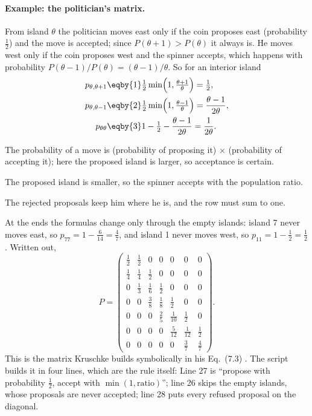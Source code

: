 \paragraph{Example: the politician's matrix.}
From island $\theta$ the politician moves east only if the coin proposes east (probability
$\tfrac12$) and the move is accepted; since $P(\theta+1)>P(\theta)$ it always is. He moves west
only if the coin proposes west and the spinner accepts, which happens with probability
$P(\theta-1)/P(\theta)=(\theta-1)/\theta$. So for an interior island
\begin{align}
  p_{\theta,\theta+1}
  &\eqby{1}\tfrac12\min\Bigl(1,\tfrac{\theta+1}{\theta}\Bigr)=\tfrac12, \nonumber\\
  p_{\theta,\theta-1}
  &\eqby{2}\tfrac12\min\Bigl(1,\tfrac{\theta-1}{\theta}\Bigr)=\frac{\theta-1}{2\theta}, \nonumber\\
  p_{\theta\theta}
  &\eqby{3}1-\tfrac12-\frac{\theta-1}{2\theta}=\frac{1}{2\theta}.
  \label{9a:eq:politician-rows}
\end{align}
\begin{explain}
  \item The probability of a move is (probability of proposing it) $\times$ (probability of
        accepting it); here the proposed island is larger, so acceptance is certain.
  \item The proposed island is smaller, so the spinner accepts with the population ratio.
  \item The rejected proposals keep him where he is, and the row must sum to one.
\end{explain}
At the ends the formulas change only through the empty islands: island 7 never moves east, so
$p_{77}=1-\tfrac{6}{14}=\tfrac47$, and island 1 never moves west, so
$p_{11}=1-\tfrac12=\tfrac12$. Written out,
\begin{equation}
  P=\begin{pmatrix}
   \frac12&\frac12&0&0&0&0&0\\[2pt]
   \frac14&\frac14&\frac12&0&0&0&0\\[2pt]
   0&\frac13&\frac16&\frac12&0&0&0\\[2pt]
   0&0&\frac38&\frac18&\frac12&0&0\\[2pt]
   0&0&0&\frac25&\frac1{10}&\frac12&0\\[2pt]
   0&0&0&0&\frac5{12}&\frac1{12}&\frac12\\[2pt]
   0&0&0&0&0&\frac37&\frac47
  \end{pmatrix}.
  \label{9a:eq:politician-matrix}
\end{equation}
This is the matrix Kruschke builds symbolically in his Eq.~(7.3) .
The script builds it in four lines, which are the rule itself:
Line 27 is ``propose with probability $\tfrac12$, accept with $\min(1,\text{ratio})$''; line 26
skips the empty islands, whose proposals are never accepted; line 28 puts every refused
proposal on the diagonal.

